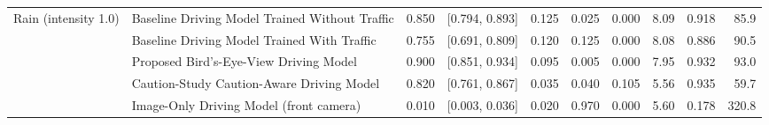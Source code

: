 \begin{tabular}{@{}llrrrrrrrr@{}}
\midrule
Rain (intensity 1.0) & Baseline Driving Model Trained Without Traffic & 0.850 & [0.794, 0.893] & 0.125 & 0.025 & 0.000 & 8.09 & 0.918 & 85.9\\
 & Baseline Driving Model Trained With Traffic & 0.755 & [0.691, 0.809] & 0.120 & 0.125 & 0.000 & 8.08 & 0.886 & 90.5\\
 & Proposed Bird's-Eye-View Driving Model & 0.900 & [0.851, 0.934] & 0.095 & 0.005 & 0.000 & 7.95 & 0.932 & 93.0\\
 & Caution-Study Caution-Aware Driving Model & 0.820 & [0.761, 0.867] & 0.035 & 0.040 & 0.105 & 5.56 & 0.935 & 59.7\\
 & Image-Only Driving Model (front camera) & 0.010 & [0.003, 0.036] & 0.020 & 0.970 & 0.000 & 5.60 & 0.178 & 320.8\\
\bottomrule\end{tabular}
